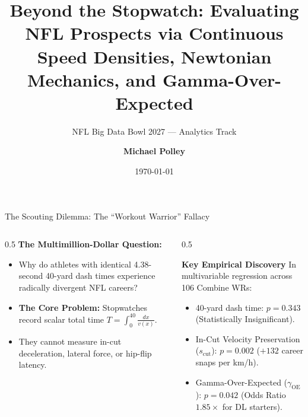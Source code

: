 \documentclass[aspectratio=169, 10pt]{beamer}
\title[\textbf{Kinetic Liquidity \& In-Cut Mechanics}]{\textbf{Beyond the Stopwatch: Evaluating NFL Prospects via Continuous Speed Densities, Newtonian Mechanics, and Gamma-Over-Expected}}
\subtitle{NFL Big Data Bowl 2027 --- Analytics Track}
\author[M. Polley]{\textbf{Michael Polley}}
\institute[BDB 2027]{National Football League $\cdot$ Big Data Bowl 2027}
\date{\today}
\begin{document}
\begin{frame}
  \titlepage
\end{frame}

\begin{frame}{The Scouting Dilemma: The ``Workout Warrior'' Fallacy}
  \begin{columns}[T]
    \begin{column}{0.5\textwidth}
      \textbf{The Multimillion-Dollar Question:}
      \begin{itemize}
        \item Why do athletes with identical 4.38-second 40-yard dash times experience radically divergent NFL careers?
        \item \textbf{The Core Problem:} Stopwatches record scalar total time $T = \int_0^{40} \frac{dx}{v(x)}$.
        \item They cannot measure in-cut deceleration, lateral force, or hip-flip latency.
      \end{itemize}
    \end{column}
    \begin{column}{0.5\textwidth}
      \begin{block}{\textbf{Key Empirical Discovery}}
        \small
        In multivariable regression across 106 Combine WRs:
        \begin{itemize}
          \item 40-yard dash time: \textbf{$p = 0.343$} (Statistically Insignificant).
          \item In-Cut Velocity Preservation ($s_{\text{cut}}$): \textbf{$p = 0.002$} ($+132$ career snaps per km/h).
          \item Gamma-Over-Expected ($\gamma_{\text{OE}}$): \textbf{$p = 0.042$} (Odds Ratio $1.85\times$ for DL starters).
        \end{itemize}
      \end{block}
    \end{column}
  \end{columns}
\end{frame}
\end{document}
